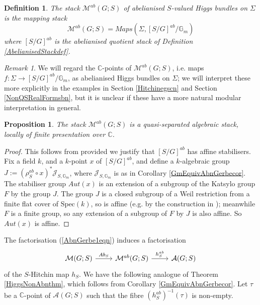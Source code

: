 \documentclass{amsart}
\newtheorem{proposition}[theorem]{Proposition}
\newtheorem{definition}[theorem]{Definition}
\theoremstyle{remark}
\newtheorem{remark}[theorem]{Remark}
\numberwithin{theorem}{section}
\numberwithin{equation}{section}
\begin{document}
\begin{definition}\label{AbnSHiggsdef}
    The \emph{stack $\mathcal M^{ab}(G;S)$ of abelianised $S$-valued Higgs bundles on $\Sigma$} is the mapping stack
    \begin{equation}\label{AbnSHiggseqn}
     \mathcal M^{ab}(G;S) = Maps(\Sigma,[S/G]^{ab}/\mathbb{G}_m)   
    \end{equation}
    where $[S/G]^{ab}$ is the abelianised quotient stack of Definition \ref{AbelianisedStackdef}.
\end{definition}

\begin{remark}\label{AbnSHiggsrmk}
    We will regard the $\mathbb{C}$-points of $\mathcal M^{ab}(G;S)$, i.e. maps $f:\Sigma \rightarrow [S/G]^{ab}/\mathbb{G}_m$, as abelianised Higgs bundles on $\Sigma$; we will interpret these more explicitly in the examples in Section \ref{Hitchinegscn} and Section \ref{NonQSRealFormsbn}, but it is unclear if these have a more natural modular interpretation in general.
\end{remark}

\begin{proposition}\label{AbnSHiggsprp}
    The stack $\mathcal M^{ab}(G;S)$ is a quasi-separated algebraic stack, locally of finite presentation over $\mathbb{C}$.
\end{proposition}

\begin{proof}
This follows from \cite[Theorem 1.2]{HR} provided we justify that $[S/G]^{ab}$ has affine stabilisers. Fix a field $k$, and a $k$-point $x$ of $[S/G]^{ab}$, and define a $k$-algebraic group $J :=(\rho_S^{ab}\circ x)^*\mathcal J_{S, \mathbb{G}_m}$, where $\mathcal J_{S, \mathbb{G}_m}$ is as in Corollary \ref{GmEquivAbnGerbecor}. The stabiliser group $Aut(x)$ is an extension of a subgroup of the Katsylo group $F$ by the group $J$. The group $J$ is a closed subgroup of a Weil restriction from a finite flat cover of $\text{Spec}(k)$, so is affine (e.g. by the construction in \cite[Section 7.6, Theorem 4]{BLR}); meanwhile $F$ is a finite group, so any extension of a subgroup of $F$ by $J$ is also affine. So $Aut(x)$ is affine.
\end{proof}

The factorisation (\ref{AbnGerbe1eqn}) induces a factorisation
\begin{equation}\label{AbnSHitchinFacteqn}
   \begin{tikzcd}
\mathcal M(G;S) \arrow[r, "Ab_S"] & \mathcal M^{ab}(G;S) \arrow[r, "h_S^{ab}"] & \mathcal A(G;S)
\end{tikzcd} 
\end{equation}
of the $S$-Hitchin map $h_S$. We have the following analogue of Theorem \ref{HiggsNonAbnthm}, which follows from Corollary \ref{GmEquivAbnGerbecor}. Let $\tau$ be a $\mathbb{C}$-point of $\mathcal A(G;S)$ such that the fibre $(h_S^{ab})^{-1}(\tau)$ is non-empty.
\end{document}

